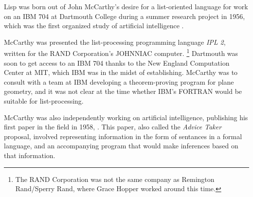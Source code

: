 Lisp was born out of John McCarthy's desire for a list-oriented language
for work on an IBM 704 at Dartmouth College during a summer research project
in 1956, which was the first organized study of artificial intelligence
\cite{mccarthy_history_of_lisp_1978}.

McCarthy was presented the list-processing programming language \textit{IPL 2},
written for the RAND Corporation's JOHNNIAC computer.
\footnote{The RAND Corporation was not the same company as Remington Rand/Sperry Rand, where Grace Hopper worked around this time.}
Dartmouth was soon to get access to an IBM 704 thanks to the New England Computation Center
at MIT, which IBM was in the midst of establishing.
McCarthy was to consult with a team at IBM developing a theorem-proving program for plane geometry,
and it was not clear at the time whether IBM's FORTRAN would be suitable for list-processing.

McCarthy was also independently working on artificial intelligence,
publishing his first paper in the field in 1958,
.
This paper, also called the \textit{Advice Taker} proposal,
involved representing information in the form of sentances in a formal language,
and an accompanying program that would make inferences based on that information.

